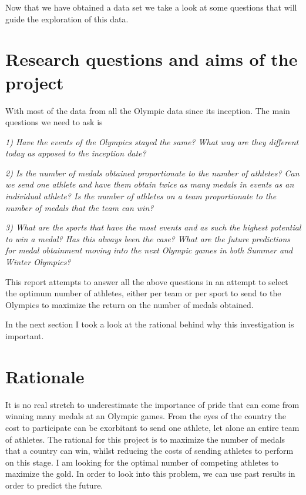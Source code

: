 \documentclass[
]{article}
\begin{document}
Now that we have obtained a data set we take a look at some questions that will guide the exploration of this data.

\newpage

\section*{Research questions and aims of the project}\label{research-questions-and-aims-of-the-project}

With most of the data from all the Olympic data since its inception. The main questions we need to ask is

\emph{1) Have the events of the Olympics stayed the same? What way are they different today as apposed to the inception date?}

\emph{2) Is the number of medals obtained proportionate to the number of athletes? Can we send one athlete and have them obtain twice as many medals in events as an individual athlete? Is the number of athletes on a team proportionate to the number of medals that the team can win?}

\emph{3) What are the sports that have the most events and as such the highest potential to win a medal? Has this always been the case? What are the future predictions for medal obtainment moving into the next Olympic games in both Summer and Winter Olympics?}

This report attempts to answer all the above questions in an attempt to select the optimum number of athletes, either per team or per sport to send to the Olympics to maximize the return on the number of medals obtained.

In the next section I took a look at the rational behind why this investigation is important.

\section*{Rationale}\label{rationale}

It is no real stretch to underestimate the importance of pride that can come from winning many medals at an Olympic games. From the eyes of the country the cost to participate can be exorbitant to send one athlete, let alone an entire team of athletes. The rational for this project is to maximize the number of medals that a country can win, whilst reducing the costs of sending athletes to perform on this stage. I am looking for the optimal number of competing athletes to maximize the gold. In order to look into this problem, we can use past results in order to predict the future.
\end{document}
